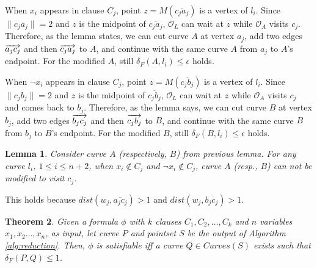 \documentclass[12pt]{dalthesis}
\def\favoritefont{\bfseries \sffamily}
\def\QED{\ensuremath{{\Box}}}
\def\markatright#1{\leavevmode\unskip\nobreak\quad\hspace*{\fill}{#1}}
\newenvironment{proof}
	{\begin{trivlist}\item[\hskip\labelsep{\favoritefont Proof:}]}
	{\markatright{\QED}\end{trivlist}}
\newtheorem{theorem}{Theorem}
\newtheorem{lemma}[theorem]{Lemma}
\newcommand{\distF}{\delta_F}
\newcommand{\CO}{{\mathscr O}}
\newcommand{\pset}{S}
\newcommand{\Seg}[1]{{\overline{#1}}}
\newcommand{\cfev}{{l}}
\begin{document}
\begin{proof}
When $x_i$ appears in clause $C_j$, point $z = M(\Seg{c_ja_j})$ is 
a vertex of $\cfev_i$. 
Since $\| c_ja_j \| = 2$ and $z$ is the  midpoint of 
 $\Seg{c_ja_j}$,
$\CO_L$ can wait at $z$ while $\CO_A$ visits $c_j$.
Therefore, as the lemma states, 
we can cut curve $A$ at vertex $a_j$,
add two edges $\overrightarrow{a_jc_j}$
and then $\overrightarrow{c_ja_j}$ to $A$,
and continue with the same 
curve $A$
from $a_j$ to $A$'s endpoint. 
For the 
modified $A$, still $\distF(A, \cfev_i) \le \epsilon$ holds. 

When $\neg x_i$ appears in clause $C_j$, point $z = M(\Seg{c_jb_j})$ is 
a vertex of $\cfev_i$. 
Since $\| c_jb_j \| = 2$ and $z$ is the  midpoint of 
 $\Seg{c_jb_j}$,
$\CO_L$ can wait at $z$ while $\CO_A$ visits $c_j$
and comes back to $b_j$.
Therefore, as the lemma says, 
we can cut curve $B$ at vertex $b_j$,
add two edges $\overrightarrow{b_jc_j}$
and then $\overrightarrow{c_jb_j}$ to $B$,
and continue with the same 
curve $B$
from $b_j$ to $B$'s endpoint. 
For the 
modified $B$, still $\distF(B, \cfev_i) \le \epsilon$ holds. 


\end{proof}



\begin{lemma}\label{lemma:NOTABCanSeeC}
Consider curve $A$ (respectively, $B$) from previous lemma.
For any curve $\cfev_i$, $1\le i \le n+2$,
when $ x_i \notin C_j$ and $\neg x_i \notin C_j$,   
curve $A$ (resp., $B$) can not be modified to visit $c_j$.
\end{lemma}
\begin{proof}
This holds because $dist(w_j,\Seg{a_jc_j}) >1$
and $dist(w_j,\Seg{b_jc_j}) >1$.

\end{proof}










\vspace{0.1 in}

\begin{theorem}
Given a formula $\phi$ with $k$ clauses $C_1, C_2, \dots, C_k$ and $n$ variables $x_1, x_2 \dots, x_n$,
as input, let curve $P$ and pointset $\pset$ be the output of Algorithm \ref{alg:reduction}. 
Then, $\phi$ is satisfiable iff a 
curve $Q \in Curves(S)$ exists such that 
$\distF(P,Q) \le 1$.
\end{theorem}
\end{document}
